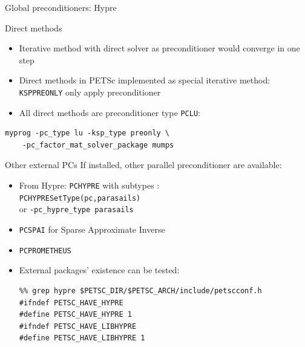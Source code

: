 \begin{longstory}
\begin{numberedframe}{Global preconditioners: Hypre}
\end{numberedframe}

\begin{details}
\begin{numberedframe}{Direct methods}
  \begin{itemize}
  \item Iterative method with direct solver as preconditioner would
    converge in one step
  \item Direct methods in PETSc implemented as special iterative
    method: \lstinline{KSPPREONLY} only apply preconditioner
  \item All direct methods are preconditioner type \lstinline{PCLU}: 
  \end{itemize}
\begin{verbatim}
myprog -pc_type lu -ksp_type preonly \
    -pc_factor_mat_solver_package mumps 
\end{verbatim}
\end{numberedframe}

\end{details}

\begin{higher}
\begin{numberedframe}{Other external PCs}
If installed, other parallel preconditioner are available:

\begin{itemize}
\item
  From Hypre: \lstinline{PCHYPRE} with subtypes :\\
  \lstinline{PCHYPRESetType(pc,parasails)}\\ or \lstinline{-pc_hypre_type parasails}
\item \lstinline{PCSPAI} for Sparse Approximate Inverse
\item \lstinline{PCPROMETHEUS}
\item External packages' existence can be tested:
\begin{verbatim}
%% grep hypre $PETSC_DIR/$PETSC_ARCH/include/petscconf.h
#ifndef PETSC_HAVE_HYPRE
#define PETSC_HAVE_HYPRE 1
#ifndef PETSC_HAVE_LIBHYPRE
#define PETSC_HAVE_LIBHYPRE 1
\end{verbatim}
\end{itemize}
\end{numberedframe}

\end{higher}

\end{longstory}

